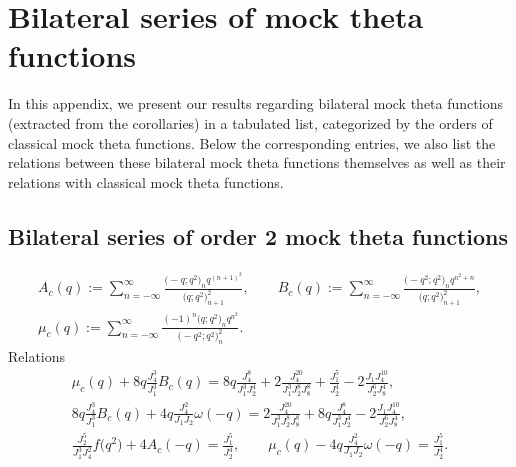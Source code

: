 \documentclass[pdftex]{sigma}
\numberwithin{equation}{section}
\begin{document}
\section{Bilateral series of mock theta functions}\label{appendixB}

In this appendix, we present our results regarding bilateral mock theta functions (extracted from the corollaries) in a tabulated list, categorized by the orders of classical mock theta functions. Below the corresponding entries, we also list the relations between these bilateral mock theta functions themselves as well as their relations with classical mock theta functions.
\subsection{Bilateral series of order 2 mock theta functions}
\begin{gather*}
A_c(q):=\sum_{n=-\infty}^{\infty}\frac{\bigl(-q;q^2\bigr)_n q^{(n+1)^2}}{\bigl(q;q^2\bigr)_{n+1}^2},\qquad
B_c(q):=\sum_{n=-\infty}^{\infty}\frac{\bigl(-q^2;q^2\bigr)_n q^{n^2+n}}{\bigl(q;q^2\bigr)_{n+1}^2},\\
\mu_c(q):=\sum_{n=-\infty}^{\infty}\frac{(-1)^n\bigl(q;q^2\bigr)_nq^{n^2}}{\bigl(-q^2;q^2\bigr)_n^2}.
\end{gather*}
Relations
\begin{gather*}
\mu_c(q)+8q\frac{J_4^3}{J_1^3}B_c(q)=8q\frac{J_4^8}{J_1^3J_2^4}
+2\frac{J_4^{20}}{J_1^3J_2^8J_8^8}+\frac{J_1^5}{J_2^4}
-2\frac{J_1J_4^{10}}{J_2^6J_8^4},\\
8q\frac{J_4^3}{J_1^3}B_c(q)+4q\frac{J_4^2}{J_1J_2}\omega(-q)=2\frac{J_4^{20}}{J_1^3J_2^8J_8^8}
+8q\frac{J_4^8}{J_1^3J_2^4}-2\frac{J_1J_4^{10}}{J_2^6J_8^4},\\
\frac{J_2^5}{J_1^3J_4^2}f\bigl(q^2\bigr)+4A_c(-q)=\frac{J_1^5}{J_2^4},\qquad\mu_c(q)-4q\frac{J_4^2}{J_1J_2}\omega(-q)=\frac{J_1^5}{J_2^4}.
\end{gather*}
\end{document}
